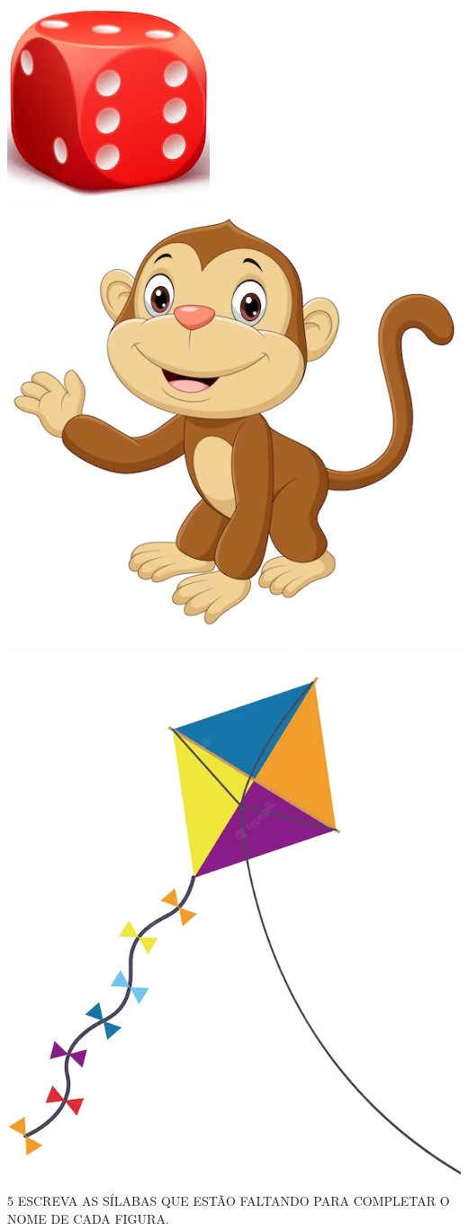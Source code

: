 \begin{escolha}

\item \includegraphics[width=.25\textwidth]{media/image14.png}


\item \includegraphics[width=.25\textwidth]{media/image15.png}


\item \includegraphics[width=.25\textwidth]{media/image16.png}

\end{escolha}


\num{5} ESCREVA AS SÍLABAS QUE ESTÃO FALTANDO PARA COMPLETAR O NOME DE CADA FIGURA.
\bigskip


